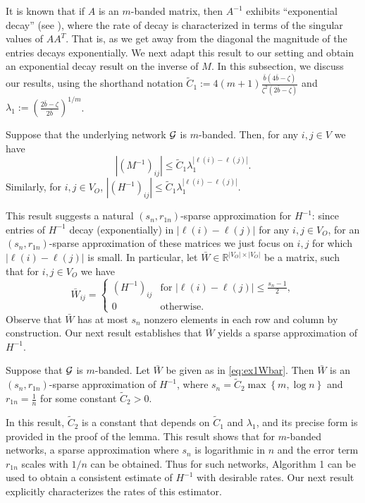 \documentclass[opre,nonblindrev]{informs3} %
\begin{document}
It is known that	if $A$ is an $m$-banded matrix,
then $A^{-1}$ exhibits
``exponential decay'' (see \cite{demko1984decay}), where the rate of  decay is characterized in terms of
the singular values of $A A^T$.
That is,
as we get away from the diagonal the magnitude of the entries decays exponentially.
We next 
adapt this result to our setting  
	and obtain an exponential decay result on the inverse of $M$.
	In this subsection, we discuss our results, using the shorthand notation 
	$\tilde{C}_1:= 	4(m+1) \frac{ \bar{b}(4 \bar{b}  - \zeta)}{\zeta^2 (2 \bar{b}-\zeta)}$ and 
	$\lambda_1 := \left(\frac{2 \bar{b}-\zeta}{2 \bar{b}}
	\right)^{1/m}$.
\begin{lemma} \label{lem:m-banded}
	Suppose that the underlying network $\cal G$ is $m$-banded. Then, for any $i,j\in V$ we have
	\begin{equation}\label{eq:m-bandedLem}
	| (M^{-1})_{ij}|
	\leq \tilde{C}_1 \lambda_1^{|\ell(i)-\ell(j)|}.
	\end{equation}
	Similarly,
	for $i,j\in V_O$,
	$|(H^{-1})_{ij}|
	\leq \tilde{C}_1 \lambda_1^{|\ell(i)-\ell(j)|}$.
\end{lemma}

This result suggests a natural $(s_n,r_{1n})$-sparse approximation for $H^{-1}$:
since entries of  
$H^{-1}$ decay (exponentially)
in $|\ell(i)-\ell(j)|$
for any  $i,j\in V_O$, for an $(s_n,r_{1n})$-sparse approximation of these matrices we just focus on
$i,j$ for which $|\ell(i)-\ell(j)|$ is small.
In particular,
let  $\bar W\in \mathbb{R}^{|V_O|\times |V_O|} $ be a matrix,  such that for $i,j\in V_O$ we have
\begin{equation}\label{eq:ex1Wbar}
\bar{W}_{ij}=
\begin{cases}
(H^{-1})_{ij} & \mbox{for $|\ell(i)-\ell(j)|\leq \frac{s_n-1}{2} $},\\
0 & \mbox{otherwise.}
\end{cases}
\end{equation}	
Observe that $\bar{W}$ has at most $s_n$ nonzero elements in each row and column by construction.
Our next result
establishes that $\bar{W}$ yields a sparse approximation of $H^{-1}$.


\begin{lemma}\label{lem:decayMbanded}
	Suppose that $\cal{G}$ is $m$-banded. Let
	$\bar{W}$
	be given as in \eqref{eq:ex1Wbar}.
	Then $\bar{W}$
	is an $(s_n,r_{1n})$-sparse approximation
	of  $ H^{-1}$, where
	$s_n=\tilde{C}_2 \max\left\{m,  \log {n}  \right\} $ and
	$r_{1n}=\frac{1}{n}$
	for some constant $\tilde{C}_2>0$.
\end{lemma}
In this result, $\tilde{C}_2$ is a constant that depends on $\tilde{C}_1$ and  $\lambda_1$, and its precise form is provided in the proof of the lemma.
This result shows that for $m$-banded networks, a sparse approximation where
$s_n$ is logarithmic in $n$ and the error term
$r_{1n}$ 
scales with $1/n$ can be obtained.
Thus for such networks,  Algorithm 1 can be used to obtain a consistent estimate of $H^{-1}$ 
with desirable rates. Our next result explicitly characterizes the rates of this estimator.
\end{document}
